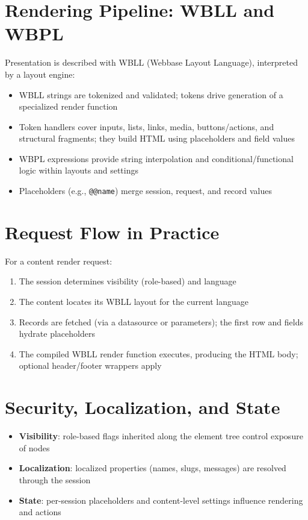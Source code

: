 \section{Rendering Pipeline: WBLL and WBPL}
Presentation is described with WBLL (Webbase Layout Language), interpreted by a layout engine:
\begin{itemize}
	\item WBLL strings are tokenized and validated; tokens drive generation of a specialized render function
	\item Token handlers cover inputs, lists, links, media, buttons/actions, and structural fragments; they build HTML using placeholders and field values
	\item WBPL expressions provide string interpolation and conditional/functional logic within layouts and settings
	\item Placeholders (e.g., \verb|@@name|) merge session, request, and record values
\end{itemize}

\section{Request Flow in Practice}
For a content render request:
\begin{enumerate}
	\item The session determines visibility (role-based) and language
	\item The content locates its WBLL layout for the current language
	\item Records are fetched (via a datasource or parameters); the first row and fields hydrate placeholders
	\item The compiled WBLL render function executes, producing the HTML body; optional header/footer wrappers apply
\end{enumerate}

\section{Security, Localization, and State}
\begin{itemize}
	\item \textbf{Visibility}: role-based flags inherited along the element tree control exposure of nodes
	\item \textbf{Localization}: localized properties (names, slugs, messages) are resolved through the session
	\item \textbf{State}: per-session placeholders and content-level settings influence rendering and actions
\end{itemize}


